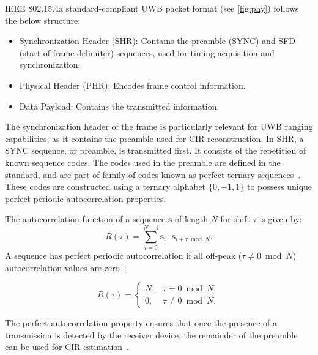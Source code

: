IEEE 802.15.4a standard-compliant UWB packet format (see \autoref{fig:phy}) follows the below structure:
\begin{itemize}
    \item Synchronization Header (SHR): Contains the preamble (SYNC) and SFD (start of frame
delimiter) sequences, used for timing acquisition and synchronization.
    \item Physical Header (PHR): Encodes frame control information.
    \item Data Payload: Contains the transmitted information.
\end{itemize}



The synchronization header of the frame is particularly relevant for UWB ranging capabilities, as it contains the preamble used for CIR reconstruction. In SHR, a SYNC sequence, or preamble, is transmitted first. It consists of the repetition of known sequence codes. %
The codes used in the preamble are defined in the standard, and are part of family of codes known as perfect ternary sequences~\cite{mcelroy2014comparison}. These codes are constructed using a ternary alphabet $\{0, -1, 1\}$ to possess unique perfect periodic autocorrelation properties. 

The autocorrelation function of a sequence $\bm s$ of length $N$ for shift $\tau$ is given by:
\begin{equation}
R(\tau) = \sum_{i=0}^{N-1} \bm s_i \cdot \bm s_{i+\tau \bmod N}.
\end{equation}
A sequence has perfect periodic autocorrelation if all off-peak ($\tau \ne 0 \bmod N$) autocorrelation values are zero~\cite{blake2014construction}:

\begin{equation}
R(\tau) =
\begin{cases}
    N, & \tau = 0 \bmod N,\\
    0, & \tau \neq 0 \bmod N.
\end{cases}
\end{equation}

The perfect autocorrelation property ensures that once the presence of a transmission is detected by the receiver device, the remainder of the preamble can be used for CIR estimation~\cite{mcelroy2014comparison}.

